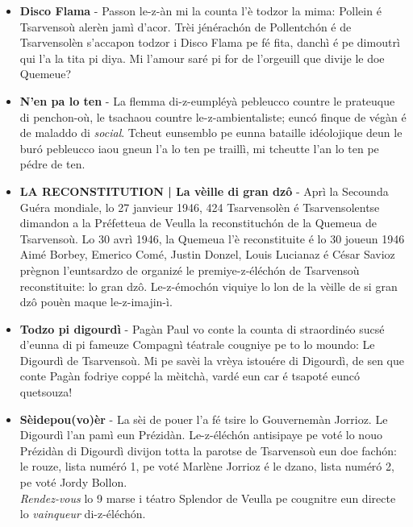 \begin{itemize}
\item[$2015$] \textbf{Disco Flama} - Passon le-z-àn mi la counta l'è todzor la mima: Pollein é Tsarvensoù alerèn jamì d'acor. Trèi jénérach\'on de Pollentch\'on é de Tsarvensolèn s'accapon todzor i Disco Flama pe fé fita, danchì é pe dimoutrì qui l'a la tita pi diya. Mi l'amour saré pi for de l'orgeuill que divije le doe Quemeue? \newline

\item[$2016$] \textbf{N'en pa lo ten} - La flemma di-z-eumpléyà pebleucco coun\-tre le prateuque di penchon-où, le tsachaou countre le-z-am\-bien\-ta\-li\-ste; eunc\'o finque de végàn é de maladdo di \textit{social}. Tcheut eunsemblo pe eunna bataille idéolojique deun le bur\'o pebleucco iaou gneun l'a lo ten pe traillì, mi tcheutte l'an lo ten pe pédre de ten.\newline

\item[$2017$] \textbf{LA RECONSTITUTION | La vèille di gran dz\^{o}} - Aprì la Secounda Guéra mondiale, lo 27 janvieur 1946, 424 Tsarvensolèn é Tsarvensolentse dimandon a la Préfetteua de Veul\-la la recon\-stituch\'on de la Quemeua de Tsarvensoù. Lo 30 avrì 1946, la Quemeua l'è reconstituite é lo 30 joueun 1946 Aimé Borbey, \mbox{Emerico} Comé, Justin Donzel, Louis Lucianaz é César Savioz prègnon l'eun\-tsardzo de organizé le premiye-z-é\-léch\'on de Tsarvensoù reconstituite: lo gran dzô. Le-z-é\-mo\-ch\'on viquiye lo lon de la vèille de si gran dzô pouèn maque le-z-imajin-ì.\newline

\item[$2018$] \textbf{Todzo pi digourdì} - Pagàn Paul vo conte la counta di straordinéo sucsé d'eunna di pi fameuze Compagnì téatrale cougniye pe to lo moundo: Le Digourdì de Tsarvensoù. Mi pe savèi la vrèya istouére di Digourdì, de sen que conte Pagàn fodriye coppé la mèitchà, vardé eun car é tsapoté eunc\'o que\-tsouza!\newline

\item[$2019$] \textbf{Sèidepou(vo)èr} - La sèi de pouer l'a fé tsire lo Gouvernemàn Jorrioz. Le Digourdì l'an pamì eun Prézidàn. Le-z-é\-léch\'on antisipaye pe voté lo nouo Prézidàn di Digourdì divijon totta la parotse de Tsarvensoù eun doe fach\'on: le rouze, lista numér\'o 1, pe voté Marlène Jorrioz é le dzano, lista numér\'o 2, pe voté Jordy Bollon. \\\textit{Rendez-vous} lo 9 marse i téatro Splendor de Veulla pe cougnitre eun directe lo \textit{vainqueur} di-z-éléch\'on.

\end{itemize}